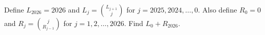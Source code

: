 Define $L_{2026}=2026$ and $L_j=\binom{L_{j+1}}j$ for $j=2025,2024,\ldots,0$. Also define $R_0=0$ and $R_j=\binom j{R_{j-1}}$ for $j=1,2,\ldots,2026$. Find $L_0+R_{2026}$.
